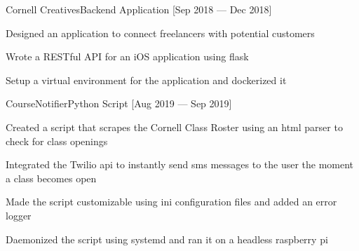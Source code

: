 \documentclass{resume}
\begin{document}
\begin{projects}
    \begin{entry}{Cornell Creatives}{}{Backend Application [Sep 2018 --- Dec
        2018]}
        \begin{description}
            \item Designed an application to connect freelancers with potential
                customers
            \item Wrote a RESTful API for an iOS application using flask
            \item Setup a virtual environment for the application and dockerized
                it
        \end{description}
    \end{entry}


    \begin{entry}{CourseNotifier}{}{Python Script [Aug 2019 --- Sep 2019]}
        \begin{description}
            \item Created a script that scrapes the Cornell Class Roster
                using an html parser to check for class openings
            \item Integrated the Twilio api to instantly send sms messages to
                the user the moment a class becomes open
            \item Made the script customizable using ini configuration files and
                added an error logger
            \item Daemonized the script using systemd and ran it on a headless
                raspberry pi
        \end{description}
    \end{entry}

\end{projects}
\end{document}
